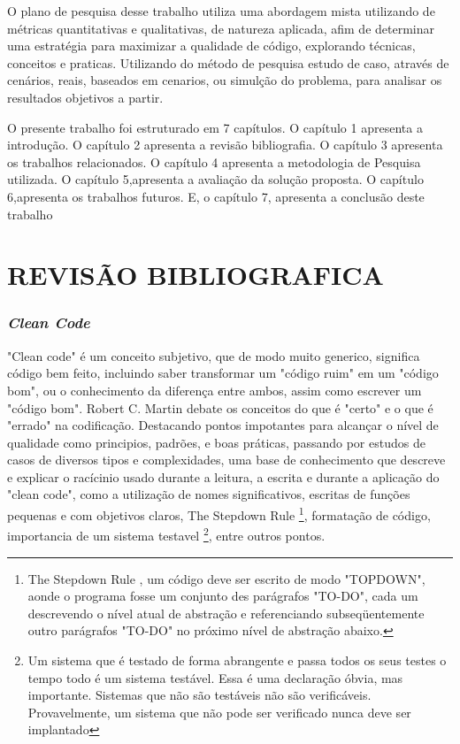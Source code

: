 \documentclass[12pt]{article}
\begin{document}
O plano de pesquisa desse trabalho utiliza uma abordagem mista utilizando de métricas quantitativas e qualitativas, de natureza aplicada, afim de determinar uma estratégia para maximizar a qualidade de código, explorando técnicas, conceitos e praticas. Utilizando do método de pesquisa estudo de caso, através de cenários, reais, baseados em cenarios, ou simulção do problema, para analisar os resultados objetivos a partir. 

O presente trabalho foi estruturado em 7 capítulos.
O capítulo 1 apresenta a introdução. 
O capítulo 2 apresenta a revisão bibliografia.
O capítulo 3 apresenta os trabalhos relacionados. 
O capítulo 4 apresenta a metodologia de Pesquisa utilizada. 
O capítulo 5,apresenta a avaliação da solução proposta.
O capítulo 6,apresenta os trabalhos futuros.
E, o capítulo 7, apresenta a conclusão deste trabalho



\part{REVISÃO BIBLIOGRAFICA} \label{sec:revisaobibliografica}

\section{\textit{Clean Code}} \label{sec:cleancode}

"Clean code" \cite{ROBERT_MARTIN_CLEAN_CODE} é um conceito subjetivo, que de modo muito generico, significa código bem feito, incluindo saber transformar um "código ruim" em um "código bom", ou o conhecimento da diferença entre ambos, assim como escrever um "código bom". Robert C. Martin \cite{ROBERT_MARTIN_CLEAN_CODE} debate os conceitos do que é "certo" e o que é "errado" na codificação. Destacando pontos impotantes para alcançar o nível de qualidade como principios, padrões, e boas práticas, passando por estudos de casos de diversos tipos e complexidades, uma base de conhecimento que descreve e explicar o racícinio usado durante a leitura, a escrita e durante a aplicação do "clean code", como a utilização de nomes significativos, escritas de funções pequenas e com objetivos claros, The Stepdown Rule \footnote{The Stepdown Rule \cite{ROBERT_MARTIN_CLEAN_CODE}, um código deve ser escrito de modo "TOPDOWN", aonde o programa fosse um conjunto des parágrafos "TO-DO", cada um descrevendo o nível atual de abstração e referenciando subseqüentemente outro parágrafos "TO-DO" no próximo nível de abstração abaixo.}, formatação de código, importancia de um sistema testavel \footnote{Um sistema que é testado de forma abrangente e passa todos os seus testes o tempo todo é um sistema testável. Essa é uma declaração óbvia, mas importante. Sistemas que não são testáveis
não são verificáveis. Provavelmente, um sistema que não pode ser verificado nunca deve ser implantado}, entre outros pontos. 
\end{document}
